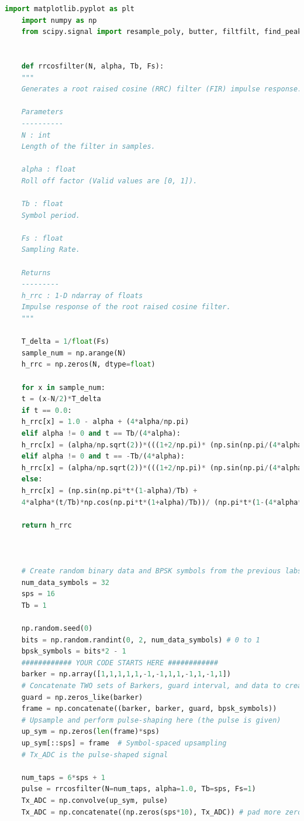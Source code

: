 \documentclass[
	letterpaper, %
	10pt, %
]{CSUniSchoolLabReport}
\begin{document}
\begin{lstlisting}[language=Python]
	import matplotlib.pyplot as plt
	import numpy as np
	from scipy.signal import resample_poly, butter, filtfilt, find_peaks
	
	
	def rrcosfilter(N, alpha, Tb, Fs):
	"""
	Generates a root raised cosine (RRC) filter (FIR) impulse response.
	
	Parameters
	----------
	N : int
	Length of the filter in samples.
	
	alpha : float
	Roll off factor (Valid values are [0, 1]).
	
	Tb : float
	Symbol period.
	
	Fs : float
	Sampling Rate.
	
	Returns
	---------
	h_rrc : 1-D ndarray of floats
	Impulse response of the root raised cosine filter.
	"""
	
	T_delta = 1/float(Fs)
	sample_num = np.arange(N)
	h_rrc = np.zeros(N, dtype=float)
	
	for x in sample_num:
	t = (x-N/2)*T_delta
	if t == 0.0:
	h_rrc[x] = 1.0 - alpha + (4*alpha/np.pi)
	elif alpha != 0 and t == Tb/(4*alpha):
	h_rrc[x] = (alpha/np.sqrt(2))*(((1+2/np.pi)* (np.sin(np.pi/(4*alpha)))) + ((1-2/np.pi)*(np.cos(np.pi/(4*alpha)))))
	elif alpha != 0 and t == -Tb/(4*alpha):
	h_rrc[x] = (alpha/np.sqrt(2))*(((1+2/np.pi)* (np.sin(np.pi/(4*alpha)))) + ((1-2/np.pi)*(np.cos(np.pi/(4*alpha)))))
	else:
	h_rrc[x] = (np.sin(np.pi*t*(1-alpha)/Tb) +
	4*alpha*(t/Tb)*np.cos(np.pi*t*(1+alpha)/Tb))/ (np.pi*t*(1-(4*alpha*t/Tb)*(4*alpha*t/Tb))/Tb)
	
	return h_rrc
	
	
	
	# Create random binary data and BPSK symbols from the previous labs
	num_data_symbols = 32
	sps = 16
	Tb = 1
	
	np.random.seed(0)
	bits = np.random.randint(0, 2, num_data_symbols) # 0 to 1
	bpsk_symbols = bits*2 - 1
	############ YOUR CODE STARTS HERE ############
	barker = np.array([1,1,1,1,1,-1,-1,1,1,-1,1,-1,1])
	# Concatenate TWO sets of Barkers, guard interval, and data to create a frame here
	guard = np.zeros_like(barker) 
	frame = np.concatenate((barker, barker, guard, bpsk_symbols))
	# Upsample and perform pulse-shaping here (the pulse is given)
	up_sym = np.zeros(len(frame)*sps)
	up_sym[::sps] = frame  # Symbol-spaced upsampling
	# Tx_ADC is the pulse-shaped signal
	
	num_taps = 6*sps + 1
	pulse = rrcosfilter(N=num_taps, alpha=1.0, Tb=sps, Fs=1)
	Tx_ADC = np.convolve(up_sym, pulse)
	Tx_ADC = np.concatenate((np.zeros(sps*10), Tx_ADC)) # pad more zeros to help frame sync simulation
	

\end{lstlisting}
\end{document}

